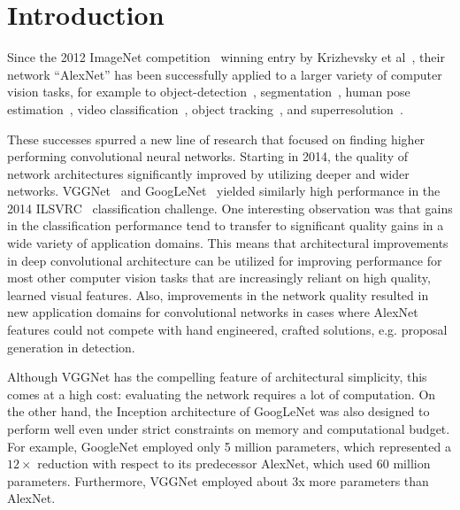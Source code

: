 \section{Introduction}

Since the 2012 ImageNet competition~\cite{russakovsky2014imagenet}
winning entry by Krizhevsky et al~\cite{krizhevsky2012imagenet},
their network ``AlexNet'' has been successfully applied to a larger variety of
computer vision tasks, for example to object-detection~\cite{girshick2014rcnn},
segmentation~\cite{long2015fully}, human pose estimation~\cite{toshev2014deeppose},
video classification~\cite{karpathy2014large}, object
tracking~\cite{wang2013learning}, and superresolution~\cite{dong2014learning}.

These successes spurred a new line of research that focused on finding
higher performing convolutional neural networks. Starting in 2014, the
quality of network architectures significantly improved
by utilizing deeper and wider networks. VGGNet~\cite{simonyan2014very} and
GoogLeNet~\cite{szegedy2015going}
yielded similarly high performance in the 2014 ILSVRC~\cite{russakovsky2014imagenet}
classification challenge. One interesting observation was that gains in the
classification performance tend to transfer to significant quality gains in a
wide variety of application domains. This means that architectural improvements
in deep convolutional architecture can be utilized for improving performance for
most other computer vision tasks that are increasingly reliant on high quality,
learned visual features.
Also, improvements in the network quality resulted in new application
domains for convolutional networks in cases where AlexNet features
could not compete with hand engineered, crafted solutions,
e.g. proposal generation in detection\cite{erhan2014scalable}.

Although VGGNet \cite{simonyan2014very} has the compelling feature
of architectural simplicity, this comes at a high cost: evaluating the
network requires a lot of computation. On the other hand, the Inception
architecture of GoogLeNet \cite{szegedy2015going} was also designed to
perform well even under strict constraints on memory and computational budget.
For example, GoogleNet employed only 5 million parameters,
which represented a $12\times$ reduction with respect to its predecessor
AlexNet, which used $60$ million parameters.
Furthermore, VGGNet employed about 3x more parameters than AlexNet.

